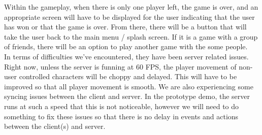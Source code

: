 \documentclass[11pt, oneside]{article}   	%
\begin{document}
Within the gameplay, when there is only one player left, the game is over, and an appropriate screen
will have to be displayed for the user indicating that the user has won or that
the game is over. From there, there will be a button that will take the user
back to the main menu / splash screen. If it is a game with a group of friends,
there will be an option to play another game with the some people.\\

In terms of difficulties we've encountered, they have been server related issues.
Right now, unless the server is funning at 60 FPS, the player movement of non-user controlled characters will be choppy and delayed.
This will have to be improved so that all player movement is smooth.
We are also experiencing some syncing issues between the client and server.
In the prototype demo, the server runs at such a speed that this is not noticeable,
however we will need to do something to fix these issues so that there is no delay in events and actions between the client(s) and server.
\end{document}

